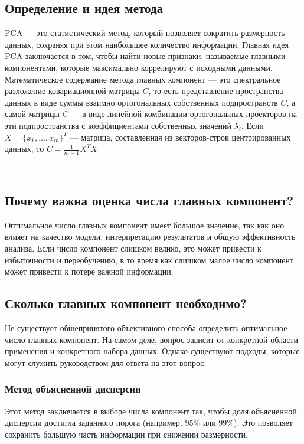\subsection{Определение и идея метода}
PCA — это статистический метод, который позволяет сократить размерность данных, сохраняя при этом наибольшее количество информации. Главная идея PCA заключается в том, чтобы найти новые признаки, называемые главными компонентами, которые максимально коррелируют с исходными данными.\\

Математическое содержание метода главных компонент — это спектральное разложение ковариационной матрицы $\displaystyle C$, то есть представление пространства данных в виде суммы взаимно ортогональных собственных подпространств
$\displaystyle C$, а самой матрицы $\displaystyle C$ — в виде линейной комбинации ортогональных проекторов на эти подпространства с коэффициентами собственных значений $\displaystyle \lambda _{i}$. Если $X = \{x_{1}, ... ,x_{m}\}^{T}$  — матрица, составленная из векторов-строк центрированных данных, то $\displaystyle C =\frac {1}{m-1} X ^{T} X$

\\

\subsection{Почему важна оценка числа главных компонент?}
Оптимальное число главных компонент имеет большое значение, так как оно влияет на качество модели, интерпретацию результатов и общую эффективность анализа. Если число компонент слишком велико, это может привести к избыточности и переобучению, в то время как слишком малое число компонент может привести к потере важной информации.

\subsection{Сколько главных компонент необходимо?}

Не существует общепринятого объективного способа определить оптимальное число главных компонент. На самом деле, вопрос зависит от конкретной области применения и конкретного набора данных. Однако существуют подходы, которые могут служить руководством для ответа на этот вопрос.

\subsubsection{Метод объясненной дисперсии}
Этот метод заключается в выборе числа компонент так, чтобы доля объясненной дисперсии достигла заданного порога (например, 95\% или 99\%). Это позволяет сохранить большую часть информации при снижении размерности.

